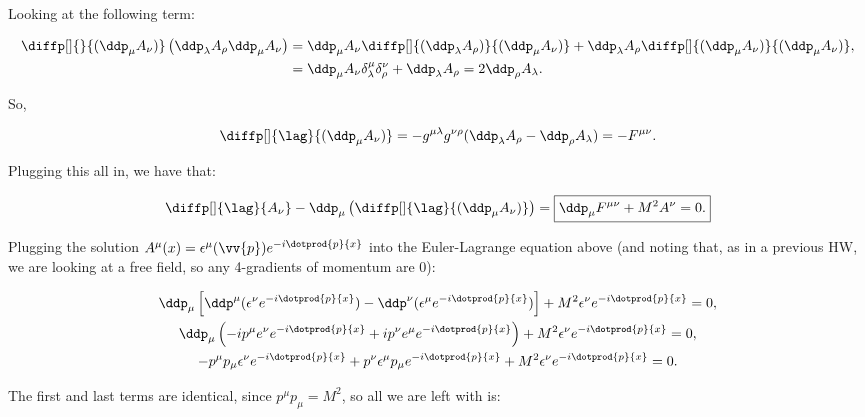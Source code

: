 \begin{parts}
Looking at the following term:

\begin{align*}
    \diffp[]{}{(\ddp_{\mu}A_{\nu})}\left( \FMUNUPROD{\lambda}{\rho}{\mu}{\nu} \right) &= \FMUNU{\mu}{\nu}\diffp[]{(\FMUNU{\lambda}{\rho})}{(\ddp_{\mu}A_{\nu})} + \FMUNU{\lambda}{\rho}\diffp[]{(\FMUNU{\mu}{\nu})}{(\FMUNU{\mu}{\nu})}, \\
    &= \FMUNU{\mu}{\nu} \delta^{\mu}_{\lambda}\delta^{\nu}_{\rho} + \FMUNU{\lambda}{\rho} = 2\FMUNU{\rho}{\lambda}.
\end{align*}

So,

\begin{equation*}
    \diffp[]{\lag}{(\FMUNU{\mu}{\nu})} = -g^{\mu\lambda}g^{\nu\rho}(\FMUNU{\lambda}{\rho} - \FMUNU{\rho}{\lambda}) = -F^{\mu\nu}.
\end{equation*}

Plugging this all in, we have that:

\begin{equation*}
    \diffp[]{\lag}{A_{\nu}} - \ddp_{\mu}\left( \diffp[]{\lag}{(\FMUNU{\mu}{\nu})} \right) = \boxed{\ddp_{\mu}F^{\mu\nu} + M^2A^{\nu} = 0.}
\end{equation*}











\item Plugging the solution $A^{\mu}(x) = \epsilon^{\mu}(\vv{p})e^{-i\dotprod{p}{x}}$ into the Euler-Lagrange equation above (and noting that, as in a previous HW, we are looking at a free field, so any 4-gradients of momentum are 0):

\begin{gather*}
    \ddp_{\mu}\left[ \ddp^{\mu}(\epsilon^{\nu}e^{-i\dotprod{p}{x}}) - \ddp^{\nu}(\epsilon^{\mu}e^{-i\dotprod{p}{x}}) \right] + M^2 \epsilon^{\nu}e^{-i\dotprod{p}{x}} = 0, \\
    \ddp_{\mu} \left( -ip^{\mu} e^{\nu}e^{-i\dotprod{p}{x}} + ip^{\nu}e^{\mu}e^{-i\dotprod{p}{x}} \right) + M^2 \epsilon^{\nu}e^{-i\dotprod{p}{x}} = 0, \\
    - p^{\mu}p_{\mu}\epsilon^{\nu}e^{-i\dotprod{p}{x}} + p^{\nu}\epsilon^{\mu}p_{\mu}e^{-i\dotprod{p}{x}} + M^2\epsilon^{\nu}e^{-i\dotprod{p}{x}} = 0.
\end{gather*}

The first and last terms are identical, since $p^{\mu}p_{\mu} = M^2$, so all we are left with is:


\end{parts}
